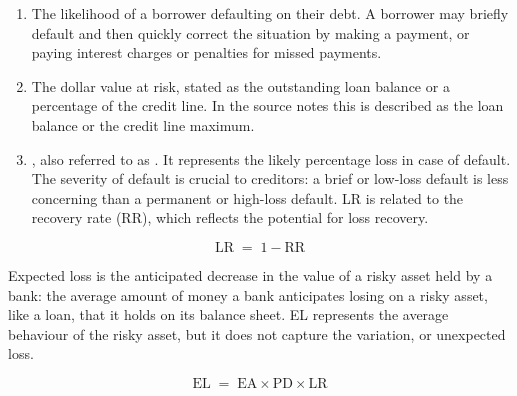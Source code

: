 
\begin{enumerate}
\item {} The likelihood of a borrower defaulting
on their debt. A borrower may briefly default and then quickly correct the
situation by making a payment, or paying interest charges or penalties for missed
payments.
\item {} The dollar value at risk, stated as the
outstanding loan balance or a percentage of the credit line. In the source notes
this is described as the loan balance or the credit line maximum.
\item {}, also referred to as . It represents the likely percentage loss in case of default. The severity
of default is crucial to creditors: a brief or low-loss default is less
concerning than a permanent or high-loss default. LR is related to the recovery
rate (RR), which reflects the potential for loss recovery.
\end{enumerate}

\begin{crfmlbox}
\[ \mathrm{LR} \;=\; 1 - \mathrm{RR} \]
\end{crfmlbox}


Expected loss is the anticipated decrease in the value of a risky asset held by a
bank: the average amount of money a bank anticipates losing on a risky asset,
like a loan, that it holds on its balance sheet. EL represents the average
behaviour of the risky asset, but it does not capture the variation, or
unexpected loss.

\begin{crfmlbox}
\[ \mathrm{EL} \;=\; \mathrm{EA} \times \mathrm{PD} \times \mathrm{LR} \]
\end{crfmlbox}

